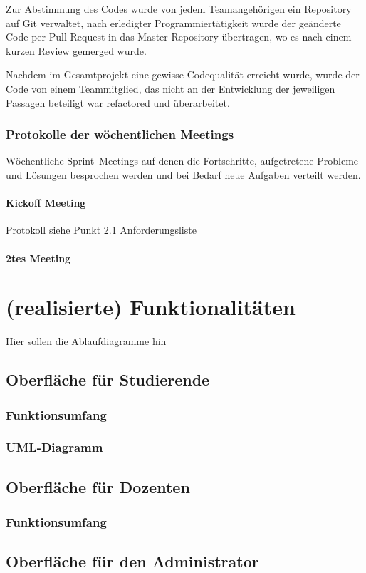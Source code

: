 \documentclass[12pt,a4paper,parskip]{scrreprt}
\begin{document}
Zur Abstimmung des Codes wurde von jedem Teamangehörigen ein Repository auf Git verwaltet, nach erledigter Programmiertätigkeit wurde der geänderte Code per Pull Request in das Master Repository übertragen, wo es nach einem kurzen Review gemerged wurde.

Nachdem im Gesamtprojekt eine gewisse Codequalität erreicht wurde, wurde der Code von einem Teammitglied, das nicht an der Entwicklung der jeweiligen Passagen beteiligt war refactored und überarbeitet.
\subsection{Protokolle der wöchentlichen Meetings}
Wöchentliche \glqq Sprint\grqq\ Meetings auf denen die Fortschritte, aufgetretene Probleme und Lösungen besprochen werden und bei Bedarf neue Aufgaben verteilt werden.
\subsubsection{Kickoff Meeting}
Protokoll siehe Punkt 2.1 Anforderungsliste
\subsubsection{2tes Meeting}

\chapter{(realisierte) Funktionalitäten}
Hier sollen die Ablaufdiagramme hin
\section{Oberfläche für Studierende}
\subsection{Funktionsumfang}
\subsection{UML-Diagramm}
\section{Oberfläche für Dozenten}
\subsection{Funktionsumfang}
\section{Oberfläche für den Administrator}
\end{document}
